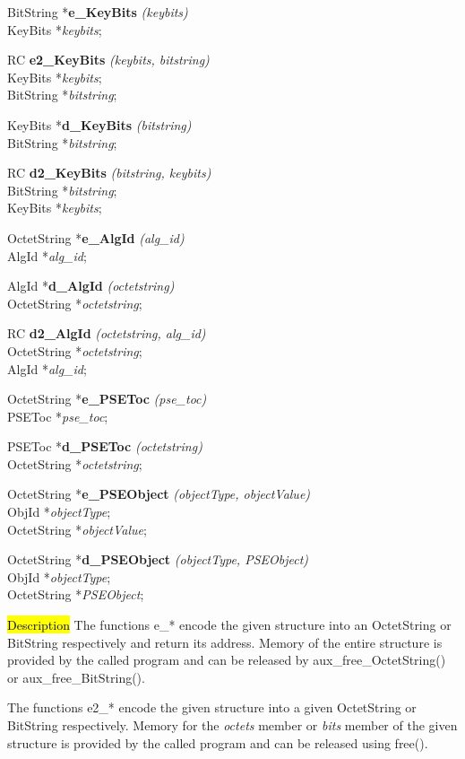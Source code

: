 BitString *{\bf e\_KeyBits} {\em (keybits)} \\
KeyBits *{\em keybits}; 

RC {\bf e2\_KeyBits} {\em (keybits, bitstring)} \\
KeyBits *{\em keybits}; \\
BitString *{\em bitstring}; 

KeyBits *{\bf d\_KeyBits} {\em (bitstring)} \\
BitString *{\em bitstring}; 

RC {\bf d2\_KeyBits} {\em (bitstring, keybits)} \\
BitString *{\em bitstring}; \\
KeyBits *{\em keybits}; 

OctetString *{\bf e\_AlgId} {\em (alg\_id)} \\
AlgId *{\em alg\_id}; 

AlgId *{\bf d\_AlgId} {\em (octetstring)} \\
OctetString *{\em octetstring}; 

RC {\bf d2\_AlgId} {\em (octetstring, alg\_id)} \\
OctetString *{\em octetstring}; \\
AlgId *{\em alg\_id}; 

OctetString *{\bf e\_PSEToc} {\em (pse\_toc)} \\
PSEToc *{\em pse\_toc}; 

PSEToc *{\bf d\_PSEToc} {\em (octetstring)} \\
OctetString *{\em octetstring}; 

OctetString *{\bf e\_PSEObject} {\em (objectType, objectValue)} \\
ObjId *{\em objectType}; \\
OctetString *{\em objectValue}; 

OctetString *{\bf d\_PSEObject} {\em (objectType, PSEObject)} \\
ObjId *{\em objectType}; \\
OctetString *{\em PSEObject}; 

\hl{Description}     
The functions e\_* encode the given structure into an OctetString or BitString
respectively and return its address. Memory of the entire structure is provided 
by the called program and can be released
by aux\_free\_OctetString() or aux\_free\_BitString(). 

The functions e2\_* encode the given structure into a given OctetString or BitString
respectively. Memory for the {\em octets} member or {\em bits} member of the given structure
is provided by the called program and can be released
using  free(). 

